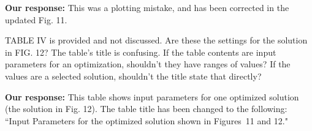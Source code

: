 \documentclass{article}
\begin{document}
{\bf Our response:} {\color{blue} This was a plotting mistake, and has been corrected in the updated Fig. 11.}

TABLE IV is provided and not discussed. Are these the settings for the
solution in FIG. 12? The table’s title is confusing. If the table
contents are input parameters for an optimization, shouldn’t they have
ranges of values? If the values are a selected solution, shouldn’t the
title state that directly?

{\bf Our response:} {\color{blue} This table shows input parameters for one optimized solution (the solution in Fig. 12). 
The table title has been changed to the following: ``Input Parameters for the optimized solution shown in Figures~11 and 12."}


 
\end{document}
